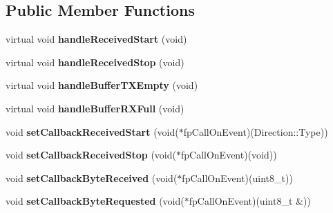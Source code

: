 \subsection*{Public Member Functions}
\begin{DoxyCompactItemize}
\item 
\hypertarget{classyahal_1_1mcu_1_1_i2_c__slave_a89a2c6293aab02189e1140082c3a0ada}{}virtual void {\bfseries handle\+Received\+Start} (void)\label{classyahal_1_1mcu_1_1_i2_c__slave_a89a2c6293aab02189e1140082c3a0ada}

\item 
\hypertarget{classyahal_1_1mcu_1_1_i2_c__slave_aff9257fb7bba6935470e7e4df7be665a}{}virtual void {\bfseries handle\+Received\+Stop} (void)\label{classyahal_1_1mcu_1_1_i2_c__slave_aff9257fb7bba6935470e7e4df7be665a}

\item 
\hypertarget{classyahal_1_1mcu_1_1_i2_c__slave_aaf745b91c3f902f135219c385e082c12}{}virtual void {\bfseries handle\+Buffer\+T\+X\+Empty} (void)\label{classyahal_1_1mcu_1_1_i2_c__slave_aaf745b91c3f902f135219c385e082c12}

\item 
\hypertarget{classyahal_1_1mcu_1_1_i2_c__slave_af2bc4067c1e2c8cc499dde9bfd55f9f2}{}virtual void {\bfseries handle\+Buffer\+R\+X\+Full} (void)\label{classyahal_1_1mcu_1_1_i2_c__slave_af2bc4067c1e2c8cc499dde9bfd55f9f2}

\item 
\hypertarget{classyahal_1_1mcu_1_1_i2_c__slave_ab21ae123a6dd0ced188cfd78b14c6de8}{}void {\bfseries set\+Callback\+Received\+Start} (void($\ast$fp\+Call\+On\+Event)(Direction\+::\+Type))\label{classyahal_1_1mcu_1_1_i2_c__slave_ab21ae123a6dd0ced188cfd78b14c6de8}

\item 
\hypertarget{classyahal_1_1mcu_1_1_i2_c__slave_a9cd6542bef603a8bc1da8ba1ba1c5f41}{}void {\bfseries set\+Callback\+Received\+Stop} (void($\ast$fp\+Call\+On\+Event)(void))\label{classyahal_1_1mcu_1_1_i2_c__slave_a9cd6542bef603a8bc1da8ba1ba1c5f41}

\item 
\hypertarget{classyahal_1_1mcu_1_1_i2_c__slave_a78a651cf27799db59250c2a5646b6502}{}void {\bfseries set\+Callback\+Byte\+Received} (void($\ast$fp\+Call\+On\+Event)(uint8\+\_\+t))\label{classyahal_1_1mcu_1_1_i2_c__slave_a78a651cf27799db59250c2a5646b6502}

\item 
\hypertarget{classyahal_1_1mcu_1_1_i2_c__slave_a7b266fcbfcc75dda6695d8a321e66ca4}{}void {\bfseries set\+Callback\+Byte\+Requested} (void($\ast$fp\+Call\+On\+Event)(uint8\+\_\+t \&))\label{classyahal_1_1mcu_1_1_i2_c__slave_a7b266fcbfcc75dda6695d8a321e66ca4}

\end{DoxyCompactItemize}
